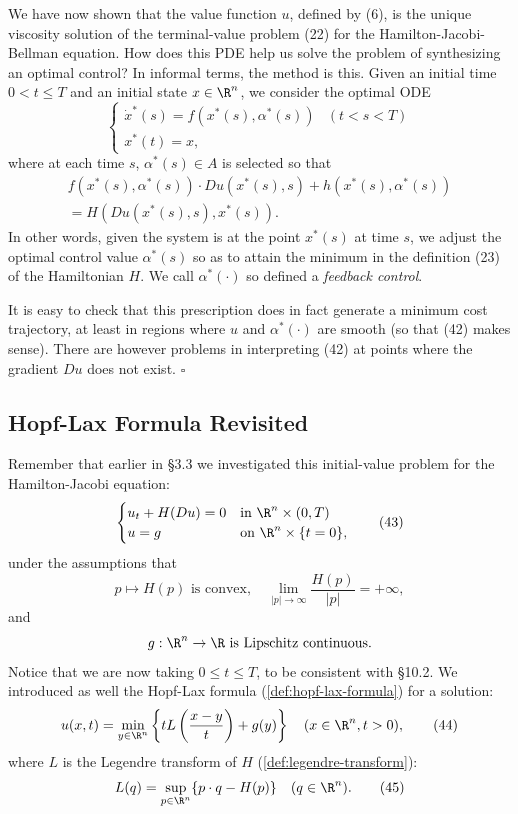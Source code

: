 \begin{remark}
\label{rem:design-of-optimal-controls}
We have now shown that the value function $u$, defined by (6), is the unique viscosity solution of the terminal-value problem (22) for the Hamilton-Jacobi-Bellman equation. How does this PDE help us solve the problem of synthesizing an optimal control? In informal terms, the method is this. Given an initial time $0 < t \leq T$ and an initial state $x \in \R^n$, we consider the optimal ODE
\[
\begin{cases} \dot{x}^*(s) = f(x^*(s), \alpha^*(s)) & (t < s < T) \\ x^*(t) = x, \end{cases}
\tag{41}
\]
where at each time $s$, $\alpha^*(s) \in A$ is selected so that
\[
\begin{aligned}
f(x^*(s), \alpha^*(s)) \cdot Du(x^*(s), s) + h(x^*(s), \alpha^*(s)) \\
= H(Du(x^*(s), s), x^*(s)).
\end{aligned}
\tag{42}
\]
In other words, given the system is at the point $x^*(s)$ at time $s$, we adjust the optimal control value $\alpha^*(s)$ so as to attain the minimum in the definition (23) of the Hamiltonian $H$. We call $\alpha^*(\cdot)$ so defined a \textit{feedback control}.

It is easy to check that this prescription does in fact generate a minimum cost trajectory, at least in regions where $u$ and $\alpha^*(\cdot)$ are smooth (so that (42) makes sense). There are however problems in interpreting (42) at points where the gradient $Du$ does not exist. $\square$
\end{remark}

\subsection{Hopf-Lax Formula Revisited}

Remember that earlier in \S3.3 we investigated this initial-value problem for the Hamilton-Jacobi equation:
\[
\begin{cases} u_t + H(Du) = 0 & \text{in } \R^n \times (0, T) \\ u = g & \text{on } \R^n \times \{t = 0\}, \end{cases}
\tag{43}
\]
under the assumptions that
\[
p \mapsto H(p) \text{ is convex}, \quad \lim_{|p| \to \infty} \frac{H(p)}{|p|} = +\infty,
\]
and
\[
g : \R^n \to \R \text{ is Lipschitz continuous.}
\]
Notice that we are now taking $0 \le t \le T$, to be consistent with \S10.2. We introduced as well the Hopf-Lax formula (\cref{def:hopf-lax-formula}) for a solution:
\[
u(x,t) = \min_{y \in \R^n} \left\{ tL \left( \frac{x-y}{t} \right) + g(y) \right\} \quad (x \in \R^n, t > 0),
\tag{44}
\]
where $L$ is the Legendre transform of $H$ (\cref{def:legendre-transform}):
\[
L(q) = \sup_{p \in \R^n} \{ p \cdot q - H(p) \} \quad (q \in \R^n).
\tag{45}
\]

